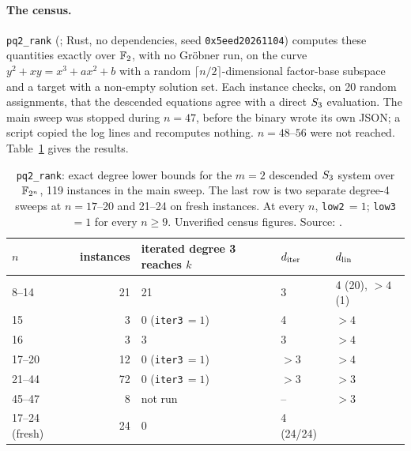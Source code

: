 \paragraph{The census.} \texttt{pq2\_rank}
(; Rust, no
dependencies, seed \texttt{0x5eed20261104}) computes these quantities
exactly over $\mathbb{F}_2$, with no Gröbner run, on the curve
$y^2+xy=x^3+ax^2+b$ with a random $\lceil n/2\rceil$-dimensional factor-base
subspace and a target with a non-empty solution set. Each instance checks,
on 20 random assignments, that the descended equations agree with a direct
$S_{3}$ evaluation. The main sweep was stopped during $n=47$, before the
binary wrote its own JSON; a script copied the log lines and recomputes
nothing. $n=48$--$56$ were not reached. Table~\ref{tab:hd-pq2} gives the
results.

\begin{table}[tbp]
\centering\small
\begin{tabular}{@{}lrlll@{}}
\toprule
$n$ & instances & iterated degree 3 reaches $k$ & $d_{\rm iter}$ & $d_{\rm lin}$ \\
\midrule
8--14 & 21 & 21 & 3 & 4 (20), $>4$ (1) \\
15 & 3 & 0 (\texttt{iter3}$\,=1$) & 4 & $>4$ \\
16 & 3 & 3 & 3 & $>4$ \\
17--20 & 12 & 0 (\texttt{iter3}$\,=1$) & $>3$ & $>4$ \\
21--44 & 72 & 0 (\texttt{iter3}$\,=1$) & $>3$ & $>3$ \\
45--47 & 8 & not run & -- & $>3$ \\
\midrule
17--24 (fresh) & 24 & 0 & 4 (24/24) & \\
\bottomrule
\end{tabular}
\caption[]{\texttt{pq2\_rank}: exact degree lower bounds for the $m=2$
descended $S_{3}$ system over $\mathbb{F}_{2^n}$, 119 instances in the main sweep.
The last row is two separate degree-4 sweeps at $n=17$--20 and 21--24 on
fresh instances. At every $n$, \texttt{low2}$\,=1$; \texttt{low3}$\,=1$ for
every $n\ge9$. Unverified census figures. Source:
.}
\label{tab:hd-pq2}
\end{table}

